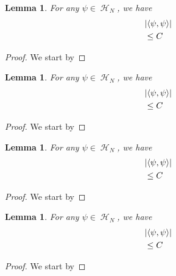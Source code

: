 \documentclass[sn-mathphys, Numbered ,a4paper]{sn-jnl}%
\DeclareMathOperator{\HH}{\mathcal{H}}
\newcommand{\eva}[1]{\left\langle #1 \right\rangle}
\theoremstyle{plain}
\newtheorem{lemma}[theorem]{Lemma}
\theoremstyle{definition}
\theoremstyle{remark}
\theoremstyle{plain}
\theoremstyle{definition}
\theoremstyle{remark}
\begin{document}
\begin{lemma}
    For any $\psi \in \HH_N$, we have
    \begin{align}
        &\abs{\eva{\psi,   \psi}}\nonumber\\&\leq C
    \end{align}
\end{lemma}
\begin{proof}
    We start by
\end{proof}

\begin{lemma}
    For any $\psi \in \HH_N$, we have
    \begin{align}
        &\abs{\eva{\psi,   \psi}}\nonumber\\&\leq C
    \end{align}
\end{lemma}
\begin{proof}
    We start by
\end{proof}

\begin{lemma}
    For any $\psi \in \HH_N$, we have
    \begin{align}
        &\abs{\eva{\psi,   \psi}}\nonumber\\&\leq C
    \end{align}
\end{lemma}
\begin{proof}
    We start by
\end{proof}

\begin{lemma}
    For any $\psi \in \HH_N$, we have
    \begin{align}
        &\abs{\eva{\psi,   \psi}}\nonumber\\&\leq C
    \end{align}
\end{lemma}
\begin{proof}
    We start by
\end{proof}
\end{document}
